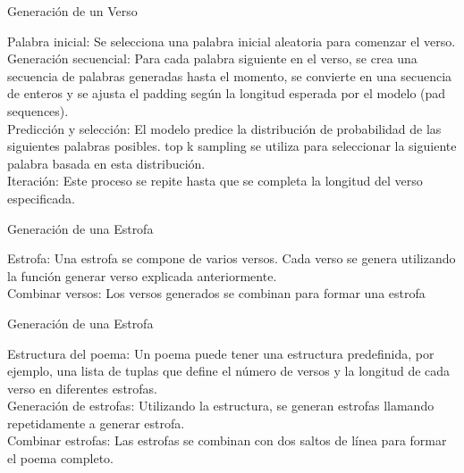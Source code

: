 \begin{center}
    Generación de un Verso
\end{center}

Palabra inicial: Se selecciona una palabra inicial aleatoria para comenzar el verso.\\ 

Generación secuencial: Para cada palabra siguiente en el verso, se crea una secuencia de palabras generadas hasta el momento, se convierte en una secuencia de enteros y se ajusta el padding según la longitud esperada por el modelo (pad sequences). \\ 

Predicción y selección: El modelo predice la distribución de probabilidad de las siguientes palabras posibles. top k sampling se utiliza para seleccionar la siguiente palabra basada en esta distribución. \\ 

Iteración: Este proceso se repite hasta que se completa la longitud del verso especificada.

\begin{center}
    Generación de una Estrofa
\end{center}

Estrofa: Una estrofa se compone de varios versos. Cada verso se genera utilizando la función generar verso explicada anteriormente. \\

Combinar versos: Los versos generados se combinan para formar una estrofa

\begin{center}
    Generación de una Estrofa
\end{center}

Estructura del poema: Un poema puede tener una estructura predefinida, por ejemplo, una lista de tuplas que define el número de versos y la longitud de cada verso en diferentes estrofas. \\ 

Generación de estrofas: Utilizando la estructura, se generan estrofas llamando repetidamente a generar estrofa.\\ 

Combinar estrofas: Las estrofas se combinan con dos saltos de línea  para formar el poema completo.\\ 